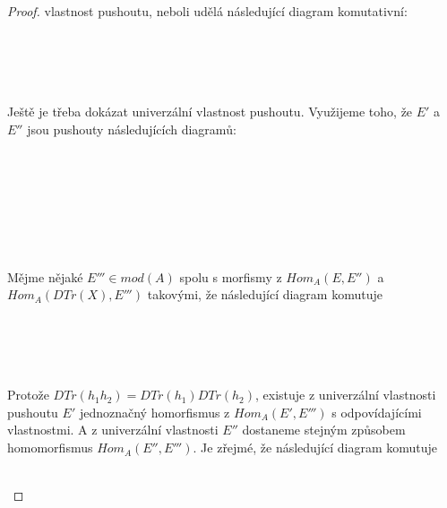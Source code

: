 \begin{proof}
          vlastnost pushoutu, neboli udělá následující diagram komutativní:\\\\
          \centerline{}\\\\\\
          Ještě je třeba dokázat univerzální vlastnost pushoutu. Využijeme toho, 
          že $E'$  a $E''$ jsou pushouty následujících diagramů:\\\\
          \centerline{\\\\}\\\\\\
          Mějme nějaké $E'''\in mod(A)$ spolu s morfismy z $Hom_A(E,E'')$ a $Hom_A(DTr(X),E''')$ 
          takovými, že následující diagram komutuje\\\\
          \centerline{}\\\\\\
          Protože $DTr(h_1h_2)=DTr(h_1)DTr(h_2)$, 
          existuje z univerzální vlastnosti pushoutu 
          $E'$ jednoznačný homorfismus z $Hom_A(E',E''')$ s odpovídajícími 
          vlastnostmi. A z univerzální vlastnosti $E''$ dostaneme stejným způsobem homomorfismus
          $Hom_A(E'',E''')$. Je zřejmé, že následující diagram komutuje \\\\
          \centerline{}
\end{proof}
